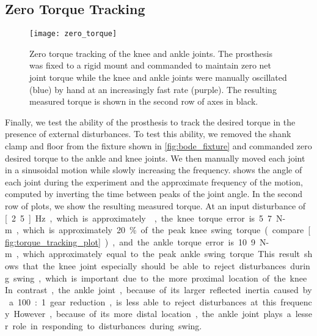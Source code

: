 \subsection{Zero Torque Tracking}
\begin{figure}[b!]
    \centering 
    \texttt{[image: zero\_torque]}
    \caption[Zero torque tracking of the knee and ankle joints]{Zero torque
    tracking of the knee and ankle joints. The prosthesis was fixed to a rigid
    mount and commanded to maintain zero net joint torque while the knee and
    ankle joints were manually oscillated (blue) by hand at an increasingly fast
    rate (purple).  The resulting measured torque is shown in the second row of
    axes in black.}\label{fig:pros_eval_zero_torque}
\end{figure}
Finally, we test the ability of the prosthesis to track the desired torque in
the presence of external disturbances. To test this ability, we removed the
shank clamp and floor from the fixture shown in \cref{fig:bode_fixture} and
commanded zero desired torque to the ankle and knee joints. We then manually
moved each joint in a sinusoidal motion while slowly increasing the frequency.
 shows the angle of each joint during the
experiment and the approximate frequency of the motion, computed by inverting
the time between peaks of the joint angle. In the second row of plots, we show
the resulting measured torque. At an input disturbance of \unit[2.5]{Hz}, which
is approximately , the knee torque error is
\unit{5.7}{N-m}, which is approximately 20\% of the peak knee swing torque
(compare \cref{fig:torque_tracking_plot}), and the ankle torque error is
\unit{10.9}{N-m}, which approximately equal to the peak ankle swing torque. This
result shows that the knee joint especially should be able to reject
disturbances during swing, which is important due to the more proximal location
of the knee. In contrast, the ankle joint, because of its larger reflected
inertia caused by a 100:1 gear reduction, is less able to reject disturbances at
this frequency.  However, because of its more distal location, the ankle joint
plays a lesser role in responding to disturbances during swing. 
